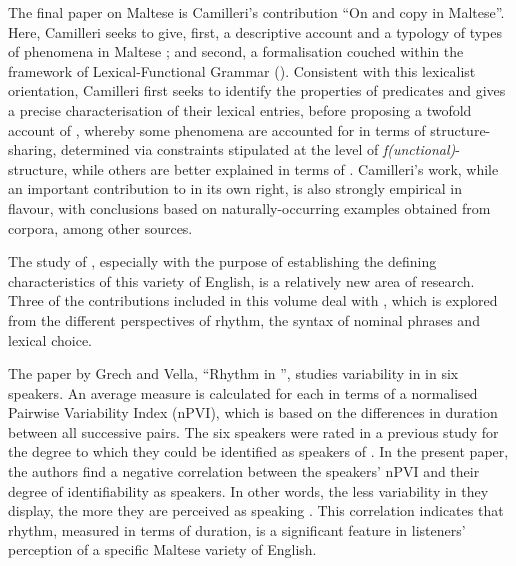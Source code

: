 \documentclass[output=paper]{LSP/langsci}
\begin{document}
The final paper on Maltese is Camilleri's contribution ``On 
and copy  in Maltese''. Here, Camilleri seeks to give, first, a
descriptive account and a typology of types of  phenomena in
Maltese%
; and second, a formalisation couched within the framework of
Lexical-Functional Grammar (). Consistent with this lexicalist
orientation, Camilleri first seeks to identify the properties of
 predicates and gives a precise characterisation of their
lexical entries, before proposing a twofold account of ,
whereby some  phenomena are accounted for in terms of
structure-sharing, determined via constraints stipulated at the level
of {\em f(unctional)}-structure, while others are better explained in
terms of . Camilleri's work, while an important
contribution to  in its own right, is also strongly empirical in
flavour, with conclusions %
based on
naturally-occurring examples obtained from corpora, among other
sources.

The study of , especially with the purpose of
establishing the defining characteristics of this variety of English,
is a relatively new area of research. Three of the contributions
included in this volume deal with , which is explored
from the different perspectives of rhythm, the syntax of nominal
phrases and lexical choice.

The paper by Grech and Vella, ``Rhythm in '', studies
variability in  in six  speakers. An
average  measure is calculated for each 
in terms of a normalised Pairwise Variability Index (nPVI), which is
based on the differences in duration between all successive 
pairs. The six speakers were rated in a previous study for the degree
to which they could be identified as speakers of . In
the present paper, the authors find a negative correlation between the
speakers' nPVI and their degree of identifiability as 
speakers. In other words, the less variability in  they
display, the more they are perceived as speaking . This
correlation indicates that rhythm, measured in terms of 
duration, is a significant feature in listeners' perception of a
specific Maltese variety of English.
\end{document}
